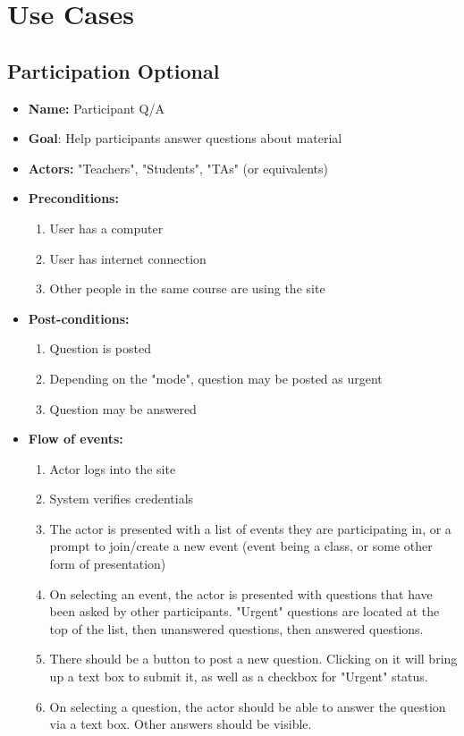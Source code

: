 \documentclass[12pt]{article}
\begin{document}
\section{Use Cases}

\subsection{Participation Optional}
\begin{itemize}
    \item \textbf{Name:} Participant Q/A
    \item \textbf{Goal}: Help participants answer questions about material 
    \item \textbf{Actors:} "Teachers", "Students", "TAs" (or equivalents)
    \item \textbf{Preconditions:} 
        \begin{enumerate}
            \item User has a computer
            \item User has internet connection
            \item Other people in the same course are using the site
        \end{enumerate}
    \item \textbf{Post-conditions:}
        \begin{enumerate}
            \item Question is posted
            \item Depending on the "mode", question may be posted as urgent
            \item Question may be answered
        \end{enumerate}
    \item \textbf{Flow of events:}
        \begin{enumerate}
            \item Actor logs into the site
            \item System verifies credentials
            \item The actor is presented with a list of events they are participating in, or a prompt to join/create a new event (event being a class, or some other form of presentation)
            \item On selecting an event, the actor is presented with questions that have been asked by other participants. "Urgent" questions are located at the top of the list, then unanswered questions, then answered questions.
            \item There should be a button to post a new question. Clicking on it will bring up a text box to submit it, as well as a checkbox for "Urgent" status.
            \item On selecting a question, the actor should be able to answer the question via a text box. Other answers should be visible.


\end{enumerate}
\end{itemize}
\end{document}
